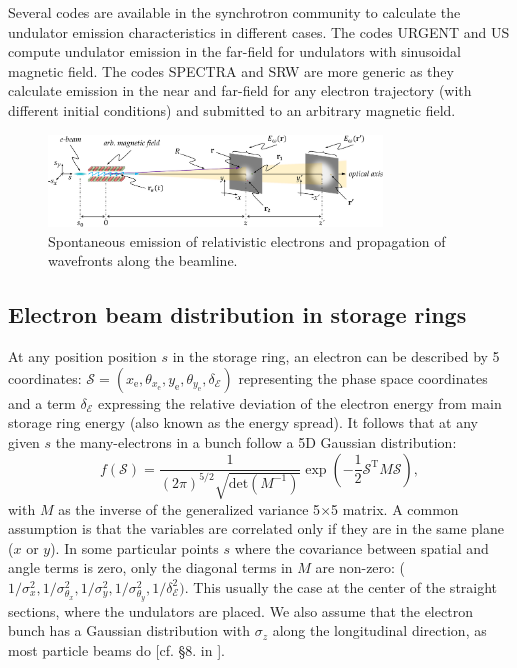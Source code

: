 \documentclass{iucr}              %
\begin{document}
Several codes are available in the synchrotron community to calculate the undulator emission characteristics in different cases. The codes URGENT \cite{codeURGENT} and US \cite{codeUS} compute undulator emission in the far-field for undulators with sinusoidal magnetic field. The codes SPECTRA \cite{Tanaka2001} and SRW \cite{codeSRW} are more generic as they calculate emission in the near and far-field for any electron trajectory (with different initial conditions) and submitted to an arbitrary magnetic field.

\onecolumn
\begin{figure}\label{fig:coordinates}
    \centering
    \includegraphics[width=0.79\textwidth]{coordinates.pdf}
    \caption{Spontaneous emission of relativistic electrons and propagation of wavefronts along the beamline.}
\end{figure}
\twocolumn


\subsection{Electron beam distribution in storage rings}
\label{sec:electronbeam}

At any position position $s$ in the storage ring, an electron can be described by 5 coordinates:
$\mathcal{S}= (x_\text{e},\theta_{x_\text{e}},y_\text{e},   \theta_{y_\text{e}},\delta_\mathcal{E})$ representing the phase space coordinates and a term $\delta_\mathcal{E}$ expressing the relative deviation of the electron energy from main storage ring energy (also known as the energy spread). It follows that at any given $s$ the many-electrons in a bunch follow a 5D Gaussian distribution:
\begin{equation}\label{eq:f-electrons}
f(\mathcal{S}) = \frac{1}{(2 \pi)^{5/2} \sqrt{\text{det}(M^{-1})}} \exp
        \left( -\frac{1}{2} \mathcal{S}^\text{T} M \mathcal{S} \right),
\end{equation}
with $M$ as the inverse of the generalized variance 5$\times$5 matrix. A common assumption is that the variables are correlated only if they are in the same plane ($x$ or $y$). In some particular points $s$ where the covariance between spatial and angle terms is zero, only the diagonal terms in $M$ are non-zero: ($1/\sigma_x^2,1/\sigma_{\theta_x}^2,1/\sigma_y^2,1/\sigma_{\theta_y}^2,1/\delta_\mathcal{E}^2)$. This usually the case at the center of the straight sections, where the undulators are placed.  We also assume that the electron bunch has a Gaussian distribution with $\sigma_z$ along the longitudinal direction, as most particle beams do [cf. \S8. in \cite{Wiedemann2015}].
 
\end{document}
